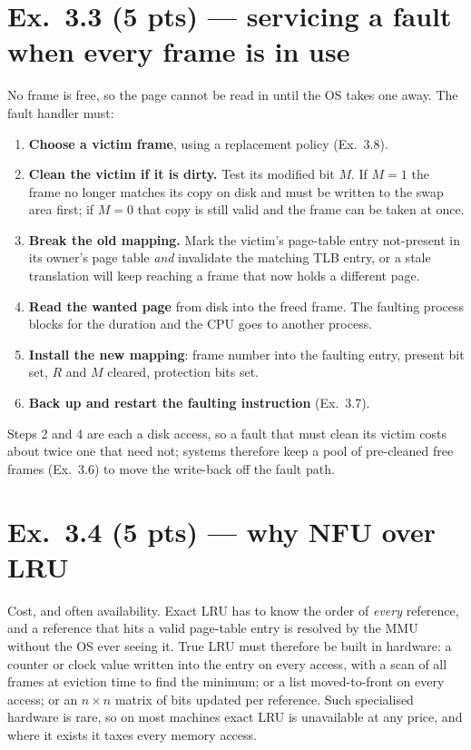 \section*{Ex.\ 3.3 \quad (5 pts) --- servicing a fault when every frame is in use}

No frame is free, so the page cannot be read in until the OS takes one away. The
fault handler must:

\begin{enumerate}[itemsep=1pt,topsep=3pt]
  \item \textbf{Choose a victim frame}, using a replacement policy (Ex.\ 3.8).
  \item \textbf{Clean the victim if it is dirty.} Test its modified bit $M$. If
        $M=1$ the frame no longer matches its copy on disk and must be written to
        the swap area first; if $M=0$ that copy is still valid and the frame can be
        taken at once.
  \item \textbf{Break the old mapping.} Mark the victim's page-table entry
        not-present in its owner's page table \emph{and} invalidate the matching TLB
        entry, or a stale translation will keep reaching a frame that now holds a
        different page.
  \item \textbf{Read the wanted page} from disk into the freed frame. The faulting
        process blocks for the duration and the CPU goes to another process.
  \item \textbf{Install the new mapping}: frame number into the faulting entry,
        present bit set, $R$ and $M$ cleared, protection bits set.
  \item \textbf{Back up and restart the faulting instruction} (Ex.\ 3.7).
\end{enumerate}

Steps 2 and 4 are each a disk access, so a fault that must clean its victim costs
about twice one that need not; systems therefore keep a pool of pre-cleaned free
frames (Ex.\ 3.6) to move the write-back off the fault path.

\section*{Ex.\ 3.4 \quad (5 pts) --- why NFU over LRU}

Cost, and often availability. Exact LRU has to know the order of \emph{every}
reference, and a reference that hits a valid page-table entry is resolved by the MMU
without the OS ever seeing it. True LRU must therefore be built in hardware: a
counter or clock value written into the entry on every access, with a scan of all
frames at eviction time to find the minimum; or a list moved-to-front on every
access; or an $n \times n$ matrix of bits updated per reference. Such specialised hardware is rare, so on most machines exact LRU is unavailable at any price, and
where it exists it taxes every memory access.

